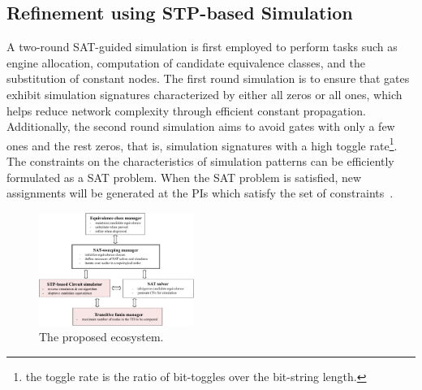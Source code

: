 \documentclass[conference]{IEEEtran}
\begin{document}
\subsection{Refinement using STP-based Simulation}
\label{sec41}
A two-round SAT-guided simulation is first employed to perform tasks such as engine allocation, computation of candidate equivalence classes, and the substitution of constant nodes. 
The first round simulation is to ensure that gates exhibit simulation signatures characterized by either all zeros or all ones, which helps reduce network complexity through efficient constant propagation. 
Additionally, the second round simulation aims to avoid gates with only a few ones and the rest zeros, that is, simulation signatures with a high toggle rate\footnote{the toggle rate is the ratio of bit-toggles over the bit-string length.}.
The constraints on the characteristics of simulation patterns can be efficiently formulated as a SAT problem.
When the SAT problem is satisfied, new assignments will be generated at the PIs which satisfy the set of constraints~\cite{intro7}.

\begin{figure}[h]
  \begin{center}
  \includegraphics[width=0.45\textwidth]{picture/system.pdf}
  \caption{The proposed ecosystem.} 
  \label{fig:system}
  \end{center}
\end{figure}
\vspace{-4mm}
\end{document}
